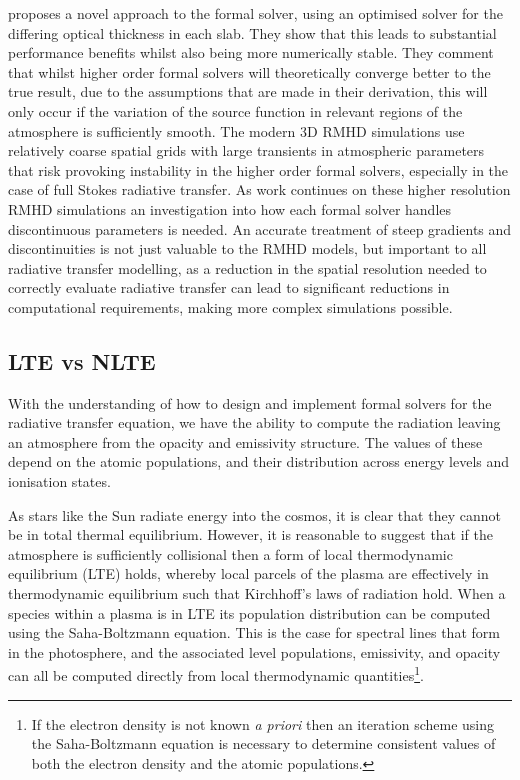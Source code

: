 \citet{Janett2018} proposes a novel approach to the formal solver,  using an optimised solver for the differing optical thickness in each slab. They show that this leads to substantial performance benefits whilst also being more numerically stable. They comment that whilst higher order formal solvers will theoretically converge better to the true result, due to the assumptions that are made in their derivation, this will only occur if the variation of the source function in relevant regions of the atmosphere is sufficiently smooth. The modern 3D RMHD simulations use relatively coarse spatial grids with large transients in atmospheric parameters that risk provoking instability in the higher order formal solvers, especially in the case of full Stokes radiative transfer.
As work continues on these higher resolution RMHD simulations an investigation into how each formal solver handles discontinuous parameters is needed.
An accurate treatment of steep gradients and discontinuities is not just valuable to the RMHD models, but important to all radiative transfer modelling, as a reduction in the spatial resolution needed to correctly evaluate radiative transfer can lead to significant reductions in computational requirements, making more complex simulations possible.


\subsection{LTE vs NLTE}

With the understanding of how to design and implement formal solvers for the radiative transfer equation, we have the ability to compute the radiation leaving an atmosphere from the opacity and emissivity structure.
The values of these depend on the atomic populations, and their distribution across energy levels and ionisation states.

As stars like the Sun radiate energy into the cosmos, it is clear that they cannot be in total thermal equilibrium.
However, it is reasonable to suggest that if the atmosphere is sufficiently collisional then a form of local thermodynamic equilibrium (LTE) holds, whereby local parcels of the plasma are effectively in thermodynamic equilibrium such that Kirchhoff's laws of radiation hold.
When a species within a plasma is in LTE its population distribution can be computed using the Saha-Boltzmann equation.
This is the case for spectral lines that form in the photosphere, and the associated level populations, emissivity, and opacity can all be computed directly from local thermodynamic quantities\footnote{If the electron density is not known \textit{a priori} then an iteration scheme using the Saha-Boltzmann equation is necessary to determine consistent values of both the electron density and the atomic populations.}.


